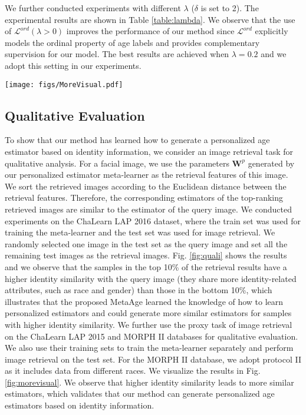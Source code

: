 \documentclass[journal,twoside]{IEEEtran}
\begin{document}
We further conducted experiments with different $\lambda$ ($\delta$ is set to 2). The experimental results are shown in Table \ref{table:lambda}. We observe that the use of $\mathcal{L}^{ord} (\lambda > 0)$ improves the performance of our method since $\mathcal{L}^{ord}$ explicitly models the ordinal property of age labels and provides complementary supervision for our model. The best results are achieved when $\lambda = 0.2$ and we adopt this setting in our experiments.






\begin{figure*}[t]
  \begin{center}
     \texttt{[image: figs/MoreVisual.pdf]}
  \end{center}
     \caption{More qualitative results on the ChaLearn LAP 2015 database and MORPH II database. The first two rows show the results on the ChaLearn LAP 2015 database, and the last two rows show the results on the MORPH II database.}
  \label{fig:morevisual}
\end{figure*}

\subsection{Qualitative Evaluation}
To show that our method has learned how to generate a personalized age estimator based on identity information, we consider an image retrieval task for qualitative analysis.
For a facial image, we use the parameters $\bm{W}^{p}$ generated by our personalized estimator meta-learner as the retrieval features of this image. We sort the retrieved images according to the Euclidean distance between the retrieval features. Therefore, the corresponding estimators of the top-ranking retrieved images are similar to the estimator of the query image. We conducted experiments on the ChaLearn LAP 2016 dataset, where the train set was used for training the meta-learner and the test set was used for image retrieval. We randomly selected one image in the test set as the query image and set all the remaining test images as the retrieval images. Fig. \ref{fig:quali} shows the results and we observe that the samples in the top 10\% of the retrieval results have a higher identity similarity with the query image (they share more identity-related attributes, such as race and gender) than those in the bottom 10\%, which illustrates that the proposed MetaAge learned the knowledge of how to learn personalized estimators and could generate more similar estimators for samples with higher identity similarity. 
We further use the proxy task of image retrieval on the ChaLearn LAP 2015 and MORPH II databases for qualitative evaluation. We also use their training sets to train the meta-learner separately and perform image retrieval on the test set. For the MORPH II database, we adopt protocol II as it includes data from different races. We visualize the results in Fig. \ref{fig:morevisual}. We observe that higher identity similarity leads to more similar estimators, which validates that our method can generate personalized age estimators based on identity information. 
\end{document}
